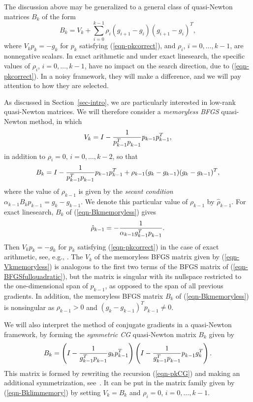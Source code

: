 \documentclass[11pt,twoside]{article}
\begin{document}
The discussion above may be generalized to a general class
of quasi-Newton matrices $B_k$ of the form
\begin{equation}\label{eqn-Bklimmemory}
B_k = V_k +
\sum_{i=0}^{k-1} \rho_i (g_{i+1}-g_i)(g_{i+1}-g_i)^T,
\end{equation}
where $V_k p_k=-g_k$ for $p_k$ satisfying (\ref{eqn-pkcorrect}), and
$\rho_i$, $i=0,\dots,k-1$, are nonnegative scalars. In exact
arithmetic and under exact linesearch, the specific values of
$\rho_i$, $i=0,\dots,k-1$, have no impact on the search direction, due
to (\ref{eqn-pkcorrect}). In a noisy framework, they will make a
difference, and we will pay attention to how they are selected.

As discussed in Section~\ref{sec-intro}, we are particularly
interested in low-rank quasi-Newton matrices. We will therefore
consider a \emph{memoryless BFGS} quasi-Newton method, in which
\begin{equation}\label{eqn-Vkmemoryless}
V_k  = I - \frac1{p_{k-1}^T p_{k-1}\drop} p_{k-1} p_{k-1}^T,
\end{equation}
in addition to $\rho_i=0$, $i=0,\dots,k-2$, so that
\begin{equation}\label{eqn-Bkmemoryless}
B_k = I - \frac1{p_{k-1}^T p_{k-1}\drop} p_{k-1} p_{k-1}^T
+ \rho_{k-1} ( g_k - g_{k-1} ) ( g_k - g_{k-1})^T,
\end{equation}
where the value of $\rho_{k-1}$ is given by the \emph{secant
  condition} $\alpha_{k-1}B_k p_{k-1}= g_k-g_{k-1}$. We denote this
particular value of $\rho_{k-1}$ by $\hat\rho_{k-1}$. For exact
linesearch, $B_k$ of (\ref{eqn-Bkmemoryless}) gives
\begin{equation}\label{eqn-secant}
\hat \rho_{k-1} = -\frac1{\alpha_{k-1}g_{k-1}^Tp_{k-1}\drop}.
\end{equation}
Then $V_k p_k=-g_k$ for $p_k$ satisfying (\ref{eqn-pkcorrect}) in the case of
exact arithmetic, see, e.g., \cite[Proposition 1]{FO18}. The $V_k$ of
the memoryless BFGS matrix given by (\ref{eqn-Vkmemoryless}) is
analogous to the first two terms of the BFGS matrix of
(\ref{eqn-BFGSfullquadratic}), but the matrix is singular with its
nullspace restricted to the one-dimensional span of $p_{k-1}$, as
opposed to the span of all previous gradients. In addition, the
memoryless BFGS matrix $B_k$ of (\ref{eqn-Bkmemoryless}) is nonsingular
as $\rho_{k-1}>0$ and $( g_k - g_{k-1})^T p_{k-1} \ne 0$.

We will also interpret the method of conjugate gradients in a
quasi-Newton framework, by forming the \emph{symmetric CG}
quasi-Newton matrix $B_k$ given by
\begin{equation}\label{eqn-BksymCG}
B_k = \left( I - \frac{1}{g_{k-1}^T p_{k-1}\drop}g_k
    p_{k-1}^T\right)
\left( I - \frac{1}{g_{k-1}^T p_{k-1}\drop} p_{k-1}\drop g_k^T\right).
\end{equation}
This matrix is formed by rewriting the recursion (\ref{eqn-pkCG}) and
making an additional symmetrization, see~\cite{FO18}. It can be put in
the matrix family given by (\ref{eqn-Bklimmemory}) by setting
$V_k=B_k$ and $\rho_i=0$, $i=0,\dots,k-1$.
\end{document}
